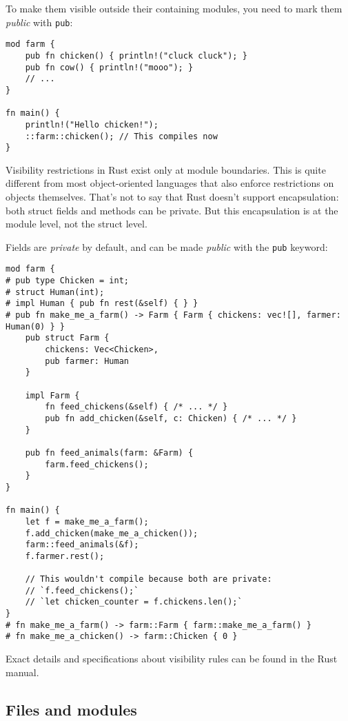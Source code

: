 \documentclass[]{article}
\begin{document}
To make them visible outside their containing modules, you need to mark
them \emph{public} with \texttt{pub}:

\begin{verbatim}
mod farm {
    pub fn chicken() { println!("cluck cluck"); }
    pub fn cow() { println!("mooo"); }
    // ...
}

fn main() {
    println!("Hello chicken!");
    ::farm::chicken(); // This compiles now
}
\end{verbatim}

Visibility restrictions in Rust exist only at module boundaries. This is
quite different from most object-oriented languages that also enforce
restrictions on objects themselves. That's not to say that Rust doesn't
support encapsulation: both struct fields and methods can be private.
But this encapsulation is at the module level, not the struct level.

Fields are \emph{private} by default, and can be made \emph{public} with
the \texttt{pub} keyword:

\begin{verbatim}
mod farm {
# pub type Chicken = int;
# struct Human(int);
# impl Human { pub fn rest(&self) { } }
# pub fn make_me_a_farm() -> Farm { Farm { chickens: vec![], farmer: Human(0) } }
    pub struct Farm {
        chickens: Vec<Chicken>,
        pub farmer: Human
    }

    impl Farm {
        fn feed_chickens(&self) { /* ... */ }
        pub fn add_chicken(&self, c: Chicken) { /* ... */ }
    }

    pub fn feed_animals(farm: &Farm) {
        farm.feed_chickens();
    }
}

fn main() {
    let f = make_me_a_farm();
    f.add_chicken(make_me_a_chicken());
    farm::feed_animals(&f);
    f.farmer.rest();

    // This wouldn't compile because both are private:
    // `f.feed_chickens();`
    // `let chicken_counter = f.chickens.len();`
}
# fn make_me_a_farm() -> farm::Farm { farm::make_me_a_farm() }
# fn make_me_a_chicken() -> farm::Chicken { 0 }
\end{verbatim}

Exact details and specifications about visibility rules can be found in
the Rust manual.

\subsection{Files and modules}\label{files-and-modules}
\end{document}
